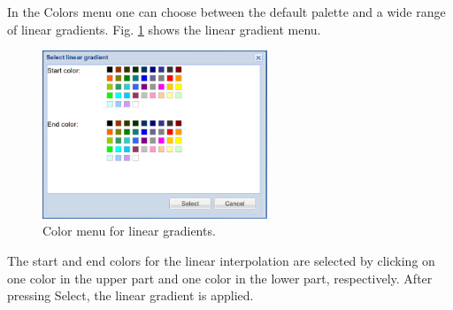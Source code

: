 \documentclass[article,A4,12pt]{llncs}
\begin{document}
In the Colors menu one can choose between the default palette and a wide
range of linear gradients. Fig. \ref{fig:lingrad} shows the linear gradient 
menu.

\begin{figure}[!ht]
\begin{center}
\includegraphics[width=0.6\textwidth]{img/lingrad.png}
\end{center}
\caption{Color menu for linear gradients.}
\label{fig:lingrad}
\end{figure}

\noindent
The start and end colors for the linear interpolation are selected
by clicking on one color in the upper part and one color in the lower 
part, respectively. After pressing Select, the linear gradient is 
applied.
\end{document}
